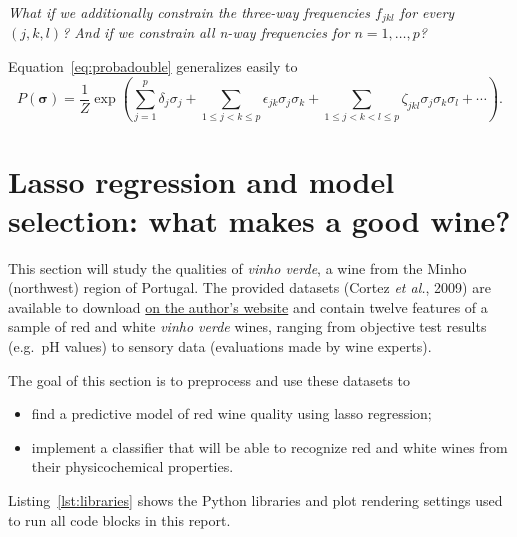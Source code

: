 \documentclass[12pt]{article}
\begin{document}
  \begin{displayquote}
    \itshape{}
    What if we additionally constrain the three-way frequencies $f_{jkl}$ for
    every $(j, k, l)$? And if we constrain all n-way frequencies for $n = 1,
    \dots, p$?
  \end{displayquote}

  Equation~\eqref{eq:probadouble} generalizes easily to
  \begin{equation}\label{eq:probadouble}
    P(\bm{\sigma}) = \frac{1}{Z}\exp\left(\sum_{j = 1}^p \delta_j\sigma_j
    + \sum_{1 \leq j < k \leq p} \epsilon_{jk} \sigma_j\sigma_k
    + \sum_{1 \leq j < k < l \leq p} \zeta_{jkl} \sigma_j\sigma_k\sigma_l
    + \cdots
    \right).
  \end{equation}
  


  \newpage
  \section{Lasso regression and model selection: what makes a good wine?}

  This section will study the qualities of \textit{vinho verde}, a wine from
  the Minho (northwest) region of Portugal. The provided datasets (Cortez
  \textit{et al.}, 2009) are available to download
  \href{http://www3.dsi.uminho.pt/pcortez/wine/}{on the author's website} and
  contain twelve features of a sample of red and white \textit{vinho verde}
  wines, ranging from objective test results (e.g.\ pH values) to sensory data
  (evaluations made by wine experts).

  The goal of this section is to preprocess and use these datasets to
  \begin{itemize}
    \item find a predictive model of red wine quality using lasso regression;
    \item implement a classifier that will be able to recognize red and white
      wines from their physicochemical properties.
  \end{itemize}

  Listing~\ref{lst:libraries} shows the Python libraries and plot rendering
  settings used to run all code blocks in this report.
\end{document}
